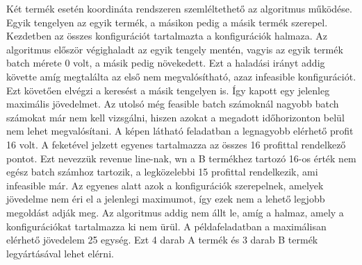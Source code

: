 Két termék esetén koordináta rendszeren szemléltethető az algoritmus működése.
Egyik tengelyen az egyik termék, a másikon pedig a másik termék szerepel.
Kezdetben az összes konfigurációt tartalmazta a konfigurációk halmaza.
Az algoritmus először végighaladt az egyik tengely mentén, vagyis az egyik termék batch mérete 0 volt, a másik pedig növekedett.
Ezt a haladási irányt addig követte amíg megtalálta az első nem megvalósítható, azaz infeasible konfigurációt.
Ezt követően elvégzi a keresést a másik tengelyen is.
Így kapott egy jelenleg maximális jövedelmet.
Az utolsó még feasible batch számoknál nagyobb batch számokat már nem kell vizsgálni, hiszen azokat a megadott időhorizonton belül nem lehet megvalósítani.
A képen látható feladatban a legnagyobb elérhető profit 16 volt.
A feketével jelzett egyenes tartalmazza az összes 16 profittal rendelkező pontot.
Ezt nevezzük revenue line-nak, wn a B termékhez tartozó 16-os érték nem egész batch számhoz tartozik, a legközelebbi 15 profittal rendelkezik, ami infeasible már.
Az egyenes alatt azok a konfigurációk szerepelnek, amelyek jövedelme nem éri el a jelenlegi maximumot, így ezek nem a lehető legjobb megoldást adják meg.
Az algoritmus addig nem állt le, amíg a halmaz, amely a konfigurációkat tartalmazza ki nem ürül.
A példafeladatban a maximálisan elérhető jövedelem 25 egység.
Ezt 4 darab A termék és 3 darab B termék legyártásával lehet elérni.